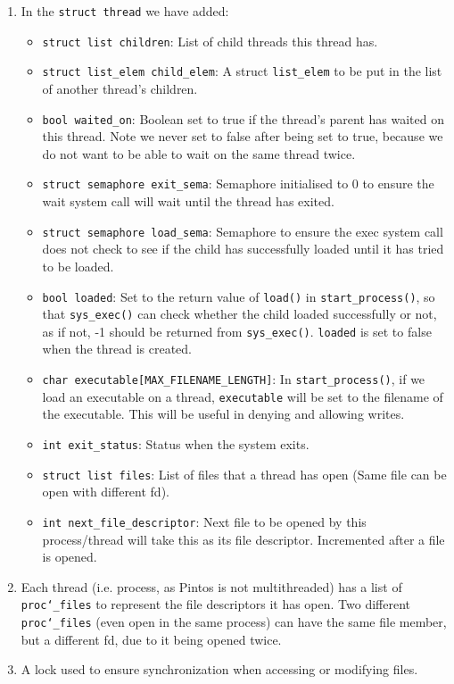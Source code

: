 \documentclass{article}
\renewcommand{\_}{\char`_}
\renewcommand{\tt}{\lstinline}
\begin{document}
\begin{enumerate}
\item In the \texttt{struct thread} we have added:
\begin{itemize}
\item \lstinline{struct list children}: List of child threads this thread has. 
\item \lstinline{struct list_elem child_elem}: A struct \lstinline{list_elem} to be put in the list of another thread's children. 
\item \lstinline{bool waited_on}: Boolean set to true if the thread's parent has waited on this thread. Note we never set to false after 
being set to true, because we do not want to be able to wait on the same thread twice.
\item \lstinline{struct semaphore exit_sema}: Semaphore initialised to 0 to ensure the wait system call will wait until the thread has exited.
\item \lstinline{struct semaphore load_sema}: Semaphore to ensure the exec system call does not check to see if the child has successfully loaded until it has tried to be loaded.
\item \lstinline{bool loaded}: Set to the return value of \lstinline{load()} in \lstinline{start_process()}, so that \lstinline{sys_exec()} can check whether the child loaded successfully or not, as if not, -1 should be returned from \lstinline{sys_exec()}. \lstinline{loaded} is set to false when the thread is created. 
\item \lstinline{char executable[MAX_FILENAME_LENGTH]}: In \tt{start_process()}, if we load an executable on a thread,  \lstinline{executable} will be set to the filename of the executable. This will be useful in denying and allowing writes. 
\item \lstinline{int exit_status}: Status when the system exits.
\item \lstinline{struct list files}: List of files that a thread has open (Same file can be open with different fd).
\item \lstinline{int next_file_descriptor}: Next file to be opened by this process/thread will take this as its file descriptor. Incremented after a file is opened.
\end{itemize}
\item Each thread (i.e. process, as Pintos is not multithreaded) has a list of \texttt{proc\_files} to represent the file descriptors it has open. Two different \texttt{proc\_files} (even open in the same process) can have the same file member, but a different fd, due to it being opened twice. 
\item A lock used to ensure synchronization when accessing or modifying files.

\end{enumerate}
\end{document}
